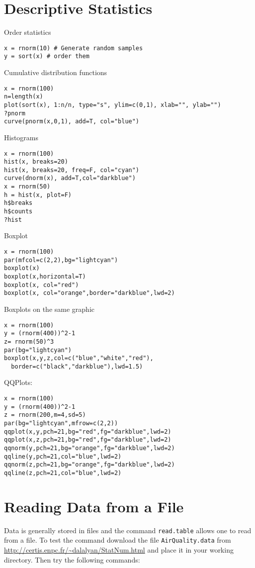 \documentclass[a4paper,10pt]{article}
\begin{document}
\section{Descriptive Statistics}\label{sec:desc}

Order statistics 
\begin{lstlisting} 
x = rnorm(10) # Generate random samples 
y = sort(x) # order them 
\end{lstlisting}

\noindent
Cumulative distribution functions 
\begin{lstlisting}
x = rnorm(100)
n=length(x)
plot(sort(x), 1:n/n, type="s", ylim=c(0,1), xlab="", ylab="")
?pnorm
curve(pnorm(x,0,1), add=T, col="blue")
\end{lstlisting}

\noindent
Histograms 
\begin{lstlisting}
x = rnorm(100)
hist(x, breaks=20)
hist(x, breaks=20, freq=F, col="cyan")
curve(dnorm(x), add=T,col="darkblue")
x = rnorm(50)
h = hist(x, plot=F)
h$breaks
h$counts
?hist
\end{lstlisting}
\noindent
Boxplot
\begin{lstlisting}
x = rnorm(100)
par(mfcol=c(2,2),bg="lightcyan")
boxplot(x)
boxplot(x,horizontal=T)
boxplot(x, col="red")
boxplot(x, col="orange",border="darkblue",lwd=2)
\end{lstlisting}

\noindent
Boxplots on the same graphic 
\begin{lstlisting}
x = rnorm(100)
y = (rnorm(400))^2-1
z= rnorm(50)^3
par(bg="lightcyan")
boxplot(x,y,z,col=c("blue","white","red"),
  border=c("black","darkblue"),lwd=1.5)
\end{lstlisting}

\noindent
QQPlots: 
\begin{lstlisting}
x = rnorm(100)
y = (rnorm(400))^2-1
z = rnorm(200,m=4,sd=5)
par(bg="lightcyan",mfrow=c(2,2))
qqplot(x,y,pch=21,bg="red",fg="darkblue",lwd=2)
qqplot(x,z,pch=21,bg="red",fg="darkblue",lwd=2)
qqnorm(y,pch=21,bg="orange",fg="darkblue",lwd=2)
qqline(y,pch=21,col="blue",lwd=2)
qqnorm(z,pch=21,bg="orange",fg="darkblue",lwd=2)
qqline(z,pch=21,col="blue",lwd=2)
\end{lstlisting}

\section{Reading Data from a File} 

Data is generally stored in files and the command \texttt{read.table} allows one to read from a file. To test the command download the file \texttt{AirQuality.data} from \url{http://certis.enpc.fr/~dalalyan/StatNum.html} and place it in your working directory. Then try the following commands: 
\end{document}
